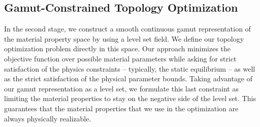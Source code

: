 \subsection{Gamut-Constrained Topology Optimization}
In the second stage, we construct a smooth continuous gamut representation of the material property space by using a level set field. We define our topology optimization problem directly in this space. Our approach minimizes the objective function over possible material parameters while asking for strict satisfaction of the physics constraints -- typically, the static equilibrium -- as well as the strict satisfaction of the physical parameter bounds. Taking advantage of our gamut representation as a level set, we formulate this last constraint as limiting the material properties to stay on the negative side of the level set. This guarantees that the material properties that we use in the optimization are always physically realizable.


